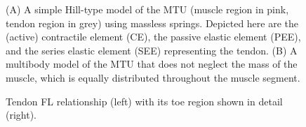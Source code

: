 \documentclass{sfuthesis}
\numberwithin{equation}{section}
\numberwithin{figure}{chapter}
\numberwithin{table}{chapter}
\theoremstyle{definition}
\begin{document}
\begin{figure}
    \caption{(A) A simple Hill-type model of the MTU (muscle region in pink, tendon region in grey) using massless springs. Depicted here are the (active) contractile element (CE), the passive elastic element (PEE), and the series elastic element (SEE) representing the tendon. (B) A multibody model of the MTU that does not neglect the mass of the muscle, which is equally distributed throughout the muscle segment.}
    \label{fig:muscle_models_1D}
\end{figure}

\begin{figure}
    \centering
    \caption{Tendon FL relationship (left) with its toe region shown in detail (right). \label{fig:plot_FT}}
\end{figure}

    
    
\end{document}
